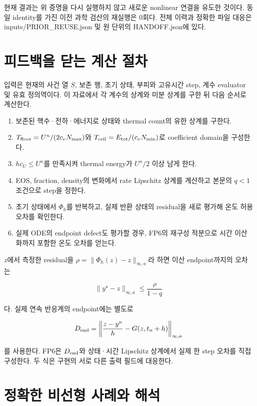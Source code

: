\documentclass[11pt,a4paper]{article}
\providecommand{\tightlist}{\setlength{\itemsep}{2pt}\setlength{\parskip}{0pt}}
\begin{document}
현재 결과는 위 증명을 다시 실행하지 않고 새로운 nonlinear 연결을 유도한 것이다. 동일 identity를 가진 이전 과학 검산의 재실행은 0회다. 전체 이력과 정확한 파일 대응은 inputs/PRIOR\_REUSE.json 및 원 단위의 HANDOFF.json에 있다.

\hypertarget{uxd53cuxb4dcuxbc31uxc744-uxb2ebuxb294-uxacc4uxc0b0-uxc808uxcc28}{%
\section{피드백을 닫는 계산 절차}\label{uxd53cuxb4dcuxbc31uxc744-uxb2ebuxb294-uxacc4uxc0b0-uxc808uxcc28}}

입력은 현재의 사건 열 \(S\), 보존 행, 초기 상태, 부피와 고유시간 step, 계수 evaluator 및 유효 정의역이다. 이 자료에서 각 계수의 상계와 미분 상계를 구한 뒤 다음 순서로 계산한다.

\begin{enumerate}
\def\labelenumi{\arabic{enumi}.}
\tightlist
\item
  보존된 핵수·전하·에너지로 상태와 thermal count의 유한 상계를 구한다.
\item
  \(T_{\rm floor}=U^n/(2c_vN_{\max})\)와 \(T_{\rm ceil}=E_{\rm tot}/(c_vN_{\min})\)로 coefficient domain을 구성한다.
\item
  \(h\overline c_U\le U^n\)를 만족시켜 thermal energy가 \(U^n/2\) 이상 남게 한다.
\item
  EOS, fraction, density의 변화에서 rate Lipschitz 상계를 계산하고 본문의 \(q<1\) 조건으로 step을 정한다.
\item
  초기 상태에서 \(\Phi_h\)를 반복하고, 실제 반환 상태의 residual을 새로 평가해 온도 허용오차를 확인한다.
\item
  실제 ODE의 endpoint defect도 평가할 경우, FP6의 재구성 적분으로 시간 이산화까지 포함한 온도 오차를 얻는다.
\end{enumerate}

\(z\)에서 측정한 residual을 \(\rho=\|\Phi_h(z)-z\|_{\infty,a}\)라 하면 이산 endpoint까지의 오차는

\[
\|y^\star-z\|_{\infty,a}\le\frac{\rho}{1-q}
\]

다. 실제 연속 반응계의 endpoint에는 별도로

\[
D_{\rm end}
=\left\|\frac{z-y^n}{h}-G(z,t_n+h)\right\|_{\infty,a}
\]

를 사용한다. FP6은 \(D_{\rm end}\)와 상태·시간 Lipschitz 상계에서 실제 한 step 오차를 직접 구성한다. 두 식은 구현의 서로 다른 출력 필드에 대응한다.

\hypertarget{uxc815uxd655uxd55c-uxbe44uxc120uxd615-uxc0acuxb840uxc640-uxd574uxc11d}{%
\section{정확한 비선형 사례와 해석}\label{uxc815uxd655uxd55c-uxbe44uxc120uxd615-uxc0acuxb840uxc640-uxd574uxc11d}}
\end{document}
